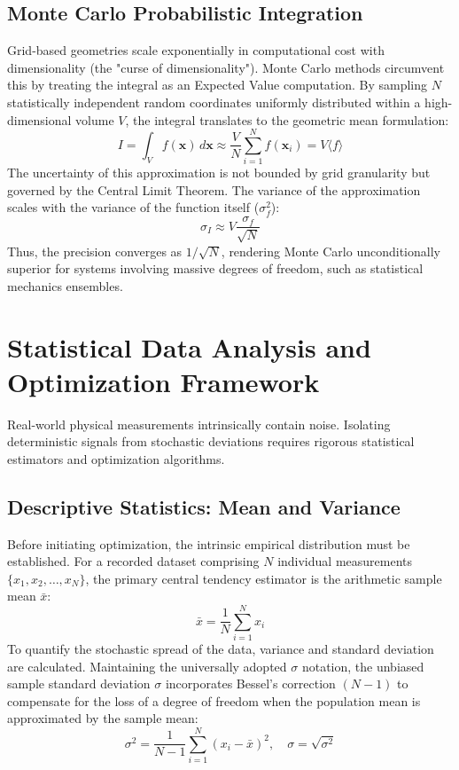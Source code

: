 \documentclass[aps, reprint, twocolumn, superscriptaddress, floatfix]{revtex4-2}
\begin{document}
\subsection{Monte Carlo Probabilistic Integration}
Grid-based geometries scale exponentially in computational cost with dimensionality (the "curse of dimensionality"). Monte Carlo methods circumvent this by treating the integral as an Expected Value computation. By sampling $N$ statistically independent random coordinates uniformly distributed within a high-dimensional volume $V$, the integral translates to the geometric mean formulation:
\begin{equation}
    I = \int_V f(\mathbf{x}) \, d\mathbf{x} \approx \frac{V}{N} \sum_{i=1}^{N} f(\mathbf{x}_i) = V \langle f \rangle
\end{equation}
The uncertainty of this approximation is not bounded by grid granularity but governed by the Central Limit Theorem. The variance of the approximation scales with the variance of the function itself ($\sigma_f^2$):
\begin{equation}
    \sigma_I \approx V \frac{\sigma_f}{\sqrt{N}}
\end{equation}
Thus, the precision converges as $1/\sqrt{N}$, rendering Monte Carlo unconditionally superior for systems involving massive degrees of freedom, such as statistical mechanics ensembles.

\section{Statistical Data Analysis and Optimization Framework}

Real-world physical measurements intrinsically contain noise. Isolating deterministic signals from stochastic deviations requires rigorous statistical estimators and optimization algorithms.

\subsection{Descriptive Statistics: Mean and Variance}
Before initiating optimization, the intrinsic empirical distribution must be established. For a recorded dataset comprising $N$ individual measurements $\{x_1, x_2, \dots, x_N\}$, the primary central tendency estimator is the arithmetic sample mean $\bar{x}$:
\begin{equation}
    \bar{x} = \frac{1}{N} \sum_{i=1}^{N} x_i
\end{equation}
To quantify the stochastic spread of the data, variance and standard deviation are calculated. Maintaining the universally adopted $\sigma$ notation, the unbiased sample standard deviation $\sigma$ incorporates Bessel's correction $(N-1)$ to compensate for the loss of a degree of freedom when the population mean is approximated by the sample mean:
\begin{equation}
    \sigma^2 = \frac{1}{N-1} \sum_{i=1}^{N} (x_i - \bar{x})^2, \quad \sigma = \sqrt{\sigma^2}
\end{equation}
\end{document}

